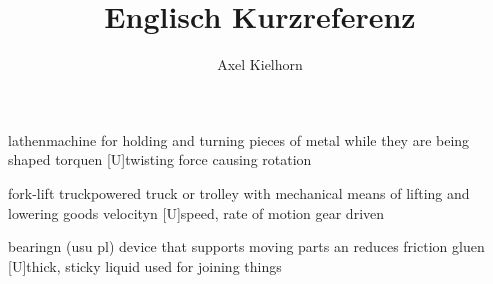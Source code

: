 \documentclass[a4paper,10pt,titlepage,twocolumns]{article}
\title{Englisch Kurzreferenz}
\author{Axel Kielhorn}
\begin{document}
\pagestyle{dictheadings} %

  {lathe}{}{n}{machine for holding and turning pieces of metal while they are being shaped}
  {torque}{}{n [U]}{twisting force causing rotation}

  {fork-lift truck}{}{}{powered truck or trolley with mechanical means of lifting and lowering goods}
  {velocity}{}{n [U]}{speed, rate of motion}
  {gear drive}{}{n}{}

  {bearing}{}{n (usu pl)}
  {device that supports moving parts an reduces friction}
  {glue}{}{n [U]}{thick, sticky liquid used for joining things}
\end{document}
